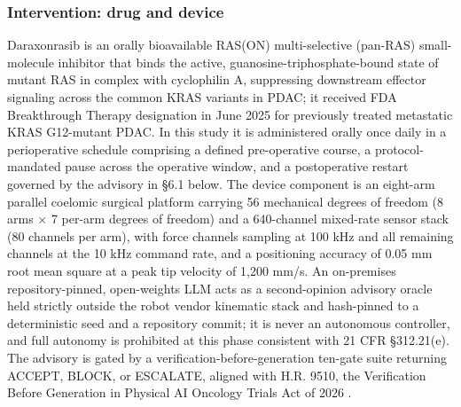 \subsubsection*{Intervention: drug and device}

Daraxonrasib is an orally bioavailable RAS(ON) multi-selective (pan-RAS)
small-molecule inhibitor that binds the active, guanosine-triphosphate-bound state
of mutant RAS in complex with cyclophilin A, suppressing downstream effector
signaling across the common KRAS variants in PDAC; it received FDA Breakthrough
Therapy designation in June 2025 for previously treated metastatic KRAS G12-mutant
PDAC. In this study it is administered orally once daily in a perioperative
schedule comprising a defined pre-operative course, a protocol-mandated pause across
the operative window, and a postoperative restart governed by the advisory in
\S 6.1 below. The device component is an eight-arm parallel coelomic surgical
platform carrying 56 mechanical degrees of freedom (8 arms $\times$ 7 per-arm
degrees of freedom) and a 640-channel mixed-rate sensor stack (80 channels per arm),
with force channels sampling at 100 kHz and all remaining channels at the 10 kHz
command rate, and a positioning accuracy of 0.05 mm root mean square at a peak tip
velocity of 1,200 mm/s. An on-premises repository-pinned, open-weights LLM acts as a
second-opinion advisory oracle held strictly outside the robot vendor kinematic
stack and hash-pinned to a deterministic seed and a repository commit; it is never
an autonomous controller, and full autonomy is prohibited at this phase consistent
with 21 CFR \S 312.21(e). The advisory is gated by a verification-before-generation
ten-gate suite returning ACCEPT, BLOCK, or ESCALATE, aligned with H.R. 9510, the
Verification Before Generation in Physical AI Oncology Trials Act of 2026
\cite{congress9510,onpremwhippl}.

